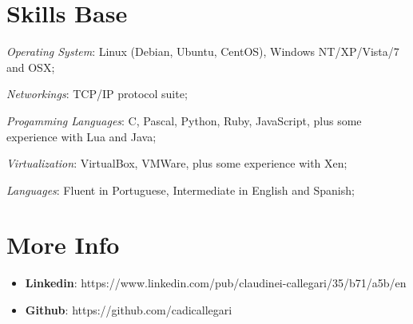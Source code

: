 \documentclass[margin]{res}
\begin{document}
\begin{resume}
\section{Skills Base}  \textit{Operating System}:  Linux (Debian, Ubuntu, CentOS), Windows NT/XP/Vista/7 and OSX;

			\textit{Networkings}: TCP/IP protocol suite;
  
			\textit{Progamming Languages}: C, Pascal, Python, Ruby, JavaScript, plus some experience with Lua and Java;
  
			\textit{Virtualization}: VirtualBox, VMWare, plus some experience with Xen;

			\textit{Languages}: Fluent in Portuguese, Intermediate in English and Spanish;
 
\section{More Info}
    \begin{itemize}
        \item \textbf{Linkedin}: https://www.linkedin.com/pub/claudinei-callegari/35/b71/a5b/en
         \item \textbf{Github}: https://github.com/cadicallegari
    \end{itemize}


\end{resume} 
\end{document}
